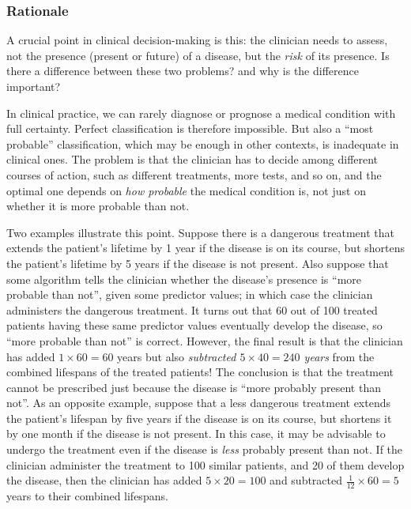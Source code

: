 \documentclass[utf8]{FrontiersinHarvard} %
\renewcommand*{\|}[1][]{\nonscript\:#1\vert\nonscript\:\mathopen{}}
\begin{document}
\subsubsection{Rationale}
\label{sec:expected_utility_theory}


A crucial point in clinical decision-making is this: the clinician needs to assess, not the presence (present or future) of a disease, but the \emph{risk} of its presence. Is there a difference between these two problems? and why is the difference important?

In clinical practice, we can rarely diagnose or prognose a medical condition with full certainty. Perfect classification is therefore impossible. But also a \enquote{most probable} classification, which may be enough in other contexts, is inadequate in clinical ones. The problem is that the clinician has to decide among different courses of action, such as different treatments, more tests, and so on, and the optimal one depends on \emph{how probable} the medical condition is, not just on whether it is more probable than not.

Two examples illustrate this point. Suppose there is a dangerous treatment that extends the patient's lifetime by 1 year if the disease is on its course, but shortens the patient's lifetime by 5 years if the disease is not present. Also suppose that some algorithm tells the clinician whether the disease's presence is \enquote{more probable than not}, given some predictor values; in which case the clinician administers the dangerous treatment. It turns out that 60 out of 100 treated patients having these same predictor values eventually develop the disease, so \enquote{more probable than not} is correct. However, the final result is that the clinician has added $1 \times 60 = 60$ years but also \emph{subtracted $\mathit{5 \times 40 = 240}$ years} from the combined lifespans of the treated patients! The conclusion is that the treatment cannot be prescribed just because the disease is \enquote{more probably present than not}. As an opposite example, suppose that a less dangerous treatment extends the patient's lifespan by five years if the disease is on its course, but shortens it by one month if the disease is not present. In this case, it may be advisable to undergo the treatment even if the disease is \emph{less} probably present than not. If the clinician administer the treatment to 100 similar patients, and 20 of them develop the disease, then the clinician has added $5 \times 20=100$ and subtracted $\tfrac{1}{12} \times 60=5$ years to their combined lifespans.
\end{document}
